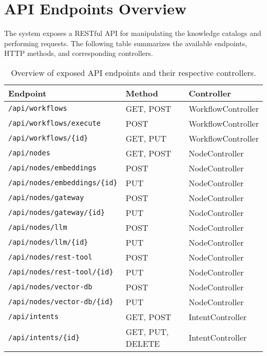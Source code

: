 \section*{API Endpoints Overview}

The system exposes a RESTful API for manipulating the knowledge catalogs and performing requests. The following table summarizes the available endpoints, HTTP methods, and corresponding controllers.

\begin{table}[H]
\centering
\caption{Overview of exposed API endpoints and their respective controllers.}
\small
\begin{tabular}{|l|l|l|}
\hline
\textbf{Endpoint} & \textbf{Method} & \textbf{Controller} \\
\hline
\texttt{/api/workflows} & GET, POST & WorkflowController \\
\texttt{/api/workflows/execute} & POST & WorkflowController \\
\texttt{/api/workflows/\{id\}} & GET, PUT & WorkflowController \\
\hline
\texttt{/api/nodes} & GET, POST & NodeController \\
\texttt{/api/nodes/embeddings} & POST & NodeController \\
\texttt{/api/nodes/embeddings/\{id\}} & PUT & NodeController \\
\texttt{/api/nodes/gateway} & POST & NodeController \\
\texttt{/api/nodes/gateway/\{id\}} & PUT & NodeController \\
\texttt{/api/nodes/llm} & POST & NodeController \\
\texttt{/api/nodes/llm/\{id\}} & PUT & NodeController \\
\texttt{/api/nodes/rest-tool} & POST & NodeController \\
\texttt{/api/nodes/rest-tool/\{id\}} & PUT & NodeController \\
\texttt{/api/nodes/vector-db} & POST & NodeController \\
\texttt{/api/nodes/vector-db/\{id\}} & PUT & NodeController \\
\hline
\texttt{/api/intents} & GET, POST & IntentController \\
\texttt{/api/intents/\{id\}} & GET, PUT, DELETE & IntentController \\
\hline
\end{tabular}

\label{tab:api_endpoints}
\end{table}



